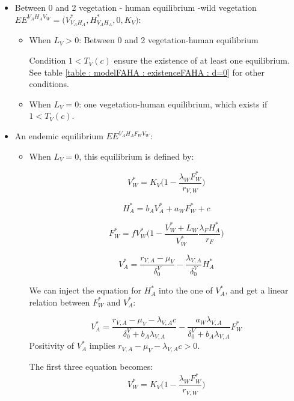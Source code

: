 \documentclass{article}
\newcommand{\lva}{\lambda_{V, A}}
\newcommand{\lfw}{\lambda_{F}}
\newcommand{\lfv}{\lambda_{W}}
\newcommand{\dv}{\delta_0^V}
\begin{document}
\begin{itemize}
\item Between 0 and 2 vegetation - human equilibrium -wild vegetation $EE^{V_AH_AV_W} = \Big( V^*_{V_AH_A}, H^*_{V_AH_A},0,K_V\Big)$:

\begin{itemize}
\item When $L_V > 0$: Between 0 and 2 vegetation-human equilibrium
 
Condition $1 < T_V(c)$ ensure the existence of at least one equilibrium. See table \ref{table : modelFAHA : existenceFAHA : d=0} for other conditions.
\item When $L_V = 0$: one vegetation-human equilibrium, which exists if $1 < T_V(c)$.
\end{itemize}

\item An endemic equilibrium $EE^{V_AH_AF_WV_W}$:
\begin{itemize}
\item When $L_V = 0$, this equilibrium is defined by:

\begin{equation*}
V_W^* = K_V \Big(1 - \dfrac{\lfv F_W^*}{r_{V,W}} \Big)
\end{equation*}

\begin{equation*}
H_A^* = b_A V_A^* + a_W F_W^* + c
\end{equation*}

\begin{equation*}
F_W^* = fV_W^* \Big(1 - \dfrac{V_W^* + L_W}{V_W^*}\dfrac{\lfw H_A^*}{r_F} \Big)
\end{equation*}

\begin{equation*}
V_A^* = \dfrac{r_{V,A} - \mu_V}{\dv} - \dfrac{\lva}{\dv}H_A^*
\end{equation*}

We can inject the equation for $H_A^*$ into the one of $V_A^*$, and get a linear relation between $F_W^*$ and $V_A^*$:

\begin{equation*}
V_A^* = \dfrac{r_{V,A} - \mu_V - \lva c}{\dv + b_A \lva} - \dfrac{a_W \lva}{\dv + b_A \lva}F^*_W
\end{equation*}
Positivity of $V_A^*$ implies $r_{V,A} - \mu_V - \lva c > 0$.


The first three equation becomes:
\begin{equation*}
V_W^* = K_V \Big(1 - \dfrac{\lfv F_W^*}{r_{V,W}} \Big)
\end{equation*}


\end{itemize}
\end{itemize}
\end{document}
